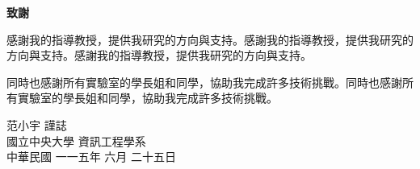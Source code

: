 \begin{center}
	\LARGE {\textbf{致謝}}
\end{center}

\bigskip  %
感謝我的指導教授，提供我研究的方向與支持。感謝我的指導教授，提供我研究的方向與支持。感謝我的指導教授，提供我研究的方向與支持。

\bigskip %
同時也感謝所有實驗室的學長姐和同學，協助我完成許多技術挑戰。同時也感謝所有實驗室的學長姐和同學，協助我完成許多技術挑戰。

\vspace{3em}

\begin{flushright}
范小宇 \qquad 謹誌 \\
國立中央大學 \quad 資訊工程學系\\
中華民國 \quad 一一五年 六月 二十五日
\end{flushright}